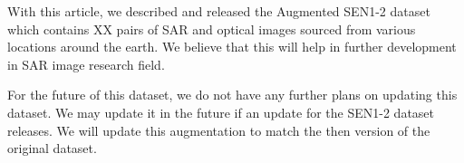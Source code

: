 With this article, we described and released the Augmented SEN1-2 dataset which contains XX pairs of SAR and optical images sourced from various locations around the earth. We believe that this will help in further development in SAR image research field.

For the future of this dataset, we do not have any further plans on updating this dataset. We may update it in the future if an update for the SEN1-2 dataset releases. We will update this augmentation to match the then version of the original dataset.